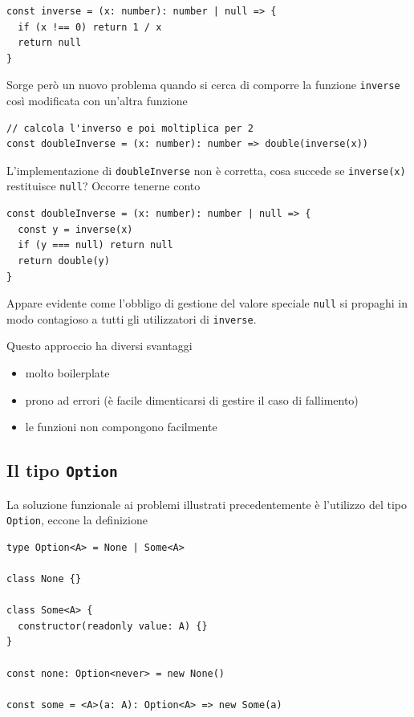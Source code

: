 \documentclass[12pt]{article}
\begin{document}
\begin{verbatim}
const inverse = (x: number): number | null => {
  if (x !== 0) return 1 / x
  return null
}
\end{verbatim}

Sorge però un nuovo problema quando si cerca di comporre la funzione \texttt{inverse} così modificata con un'altra funzione

\begin{verbatim}
// calcola l'inverso e poi moltiplica per 2
const doubleInverse = (x: number): number => double(inverse(x))
\end{verbatim}

L'implementazione di \texttt{doubleInverse} non è corretta, cosa succede se \texttt{inverse(x)} restituisce \texttt{null}?
Occorre tenerne conto

\begin{verbatim}
const doubleInverse = (x: number): number | null => {
  const y = inverse(x)
  if (y === null) return null
  return double(y)
}
\end{verbatim}

Appare evidente come l'obbligo di gestione del valore speciale \texttt{null} si propaghi in modo contagioso
a tutti gli utilizzatori di \texttt{inverse}.

Questo approccio ha diversi svantaggi

\begin{itemize}
  \item molto boilerplate
  \item prono ad errori (è facile dimenticarsi di gestire il caso di fallimento)
  \item le funzioni non compongono facilmente
\end{itemize}

\subsection{Il tipo \texttt{Option}}

La soluzione funzionale ai problemi illustrati precedentemente è l'utilizzo del tipo \texttt{Option},
eccone la definizione

\begin{verbatim}
type Option<A> = None | Some<A>

class None {}

class Some<A> {
  constructor(readonly value: A) {}
}

const none: Option<never> = new None()

const some = <A>(a: A): Option<A> => new Some(a)
\end{verbatim}
\end{document}
